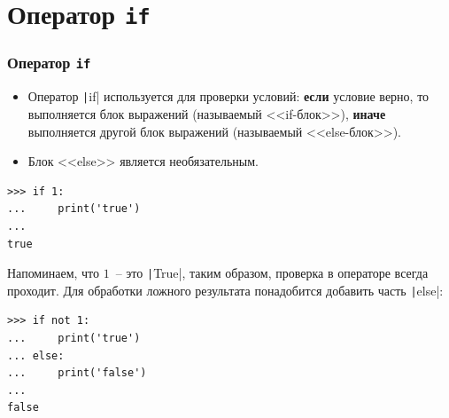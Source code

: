 \documentclass[aspectratio=169]{beamer}	%
\begin{document}
\section{Оператор \texttt{if}}

\sectionframe	%

\begin{frame}[fragile]
\frametitle{Оператор \texttt{if}}
\scriptsize
\begin{itemize}
	\item Оператор \texttt|if| используется для проверки условий: \textbf{если} условие верно, то выполняется блок выражений (называемый <<if-блок>>), \textbf{иначе} выполняется другой блок выражений (называемый <<else-блок>>).
	
	\item Блок <<else>> является необязательным. 
\end{itemize}

\begin{verbatim}
>>> if 1:
...     print('true')
...
true
\end{verbatim}

Напоминаем, что $1$~-- это \texttt|True|, таким образом, проверка в операторе всегда проходит. Для обработки ложного результата понадобится добавить часть \texttt|else|:

\begin{verbatim}
>>> if not 1:
...     print('true')
... else:
...     print('false')
...
false
\end{verbatim}
\vfill
\end{frame}
\end{document}
